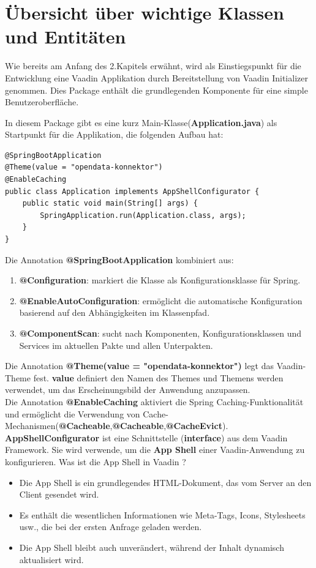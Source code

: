 \documentclass[a4paper,12pt]{scrreprt}
\begin{document}
\section{Übersicht über wichtige Klassen und Entitäten}
Wie bereits am Anfang des 2.Kapitels erwähnt, wird als Einstiegspunkt für die Entwicklung eine Vaadin Applikation durch Bereitstellung von Vaadin Initializer genommen. Dies Package enthält die grundlegenden Komponente für eine simple Benutzeroberfläche. 
	
In diesem Package gibt es eine kurz Main-Klasse(\textbf{Application.java}) als Startpunkt für die Applikation, die folgenden Aufbau hat: \\
\begin{lstlisting}
@SpringBootApplication
@Theme(value = "opendata-konnektor")
@EnableCaching
public class Application implements AppShellConfigurator {
	public static void main(String[] args) {
		SpringApplication.run(Application.class, args);
	}
}
\end{lstlisting}
	Die Annotation \textbf{@SpringBootApplication} kombiniert aus:
		\begin{enumerate}
			\item  \textbf{@Configuration}: markiert die Klasse als Konfigurationsklasse für Spring.
			\item  \textbf{@EnableAutoConfiguration}: ermöglicht die automatische Konfiguration basierend auf den Abhängigkeiten im Klassenpfad.
			\item  \textbf{@ComponentScan}: sucht nach Komponenten, Konfigurationsklassen und Services im aktuellen Pakte und allen Unterpakten.
		\end{enumerate}
	Die Annotation \textbf{@Theme(value = "opendata-konnektor")} legt das Vaadin-Theme fest. \textbf{value} definiert den Namen des Themes und Themens werden verwendet, um das Erscheinungsbild der Anwendung anzupassen.\\
	Die Annotation \textbf{@EnableCaching} aktiviert die Spring Caching-Funktionalität und ermöglicht die Verwendung von Cache-Mechanismen(\textbf{@Cacheable},\textbf{@Cacheable},\textbf{@CacheEvict}).\\
	\textbf{AppShellConfigurator} ist eine Schnittstelle (\textbf{interface}) aus dem Vaadin Framework. Sie wird verwende, um die \textbf{App Shell} einer Vaadin-Anwendung zu konfigurieren. Was ist die App Shell in Vaadin ?
	\begin{itemize}
		\item Die App Shell is ein grundlegendes HTML-Dokument, das vom Server an den Client gesendet wird.
		\item Es enthält die wesentlichen Informationen wie Meta-Tags, Icons, Stylesheets usw., die bei der ersten Anfrage geladen werden.
		\item Die App Shell bleibt auch unverändert, während der Inhalt dynamisch aktualisiert wird.
	\end{itemize}
	
\end{document}
